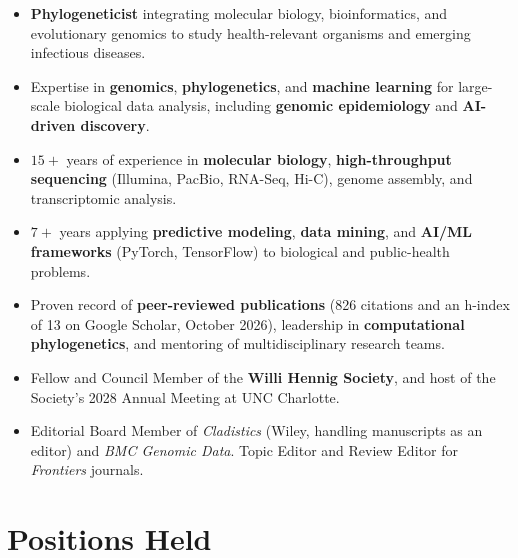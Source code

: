 \documentclass[11pt, letterpaper, sans]{moderncv}
\begin{document}
\maketitle


\begin{itemize}
    \item \textbf{Phylogeneticist} integrating molecular biology, bioinformatics, and evolutionary genomics to study health-relevant organisms and emerging infectious diseases.
    \item Expertise in \textbf{genomics}, \textbf{phylogenetics}, and \textbf{machine learning} for large-scale biological data analysis, including \textbf{genomic epidemiology} and \textbf{AI-driven discovery}.
    \item $15+$ years of experience in \textbf{molecular biology}, \textbf{high-throughput sequencing} (Illumina, PacBio, RNA-Seq, Hi-C), genome assembly, and transcriptomic analysis.
    \item $7+$ years applying \textbf{predictive modeling}, \textbf{data mining}, and \textbf{AI/ML frameworks} (PyTorch, TensorFlow) to biological and public-health problems.
    \item Proven record of \textbf{peer-reviewed publications} (826 citations and an h-index of 13 on Google Scholar, October 2026), leadership in \textbf{computational phylogenetics}, and mentoring of multidisciplinary research teams.
    \item Fellow and Council Member of the \textbf{Willi Hennig Society}, and host of the Society's 2028 Annual Meeting at UNC Charlotte.
    \item Editorial Board Member of \textit{Cladistics} (Wiley, handling manuscripts as an editor) and \textit{BMC Genomic Data}. Topic Editor and Review Editor for \textit{Frontiers} journals.
\end{itemize}


\section{Positions Held}
\end{document}
